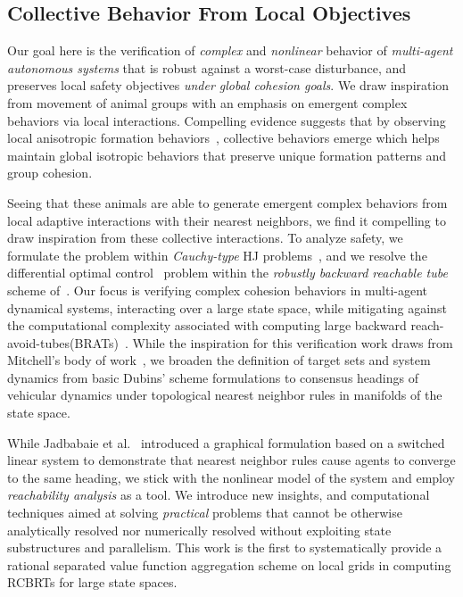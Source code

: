 \subsection{Collective Behavior From Local Objectives}
%
Our goal here is the verification of  \textit{complex} and \textit{nonlinear} behavior of  \textit{multi-agent autonomous systems} that is robust against a worst-case disturbance, and preserves local safety objectives \textit{under global cohesion goals}. We draw inspiration from  movement of animal groups with an emphasis on emergent complex behaviors via local interactions. Compelling evidence suggests that by observing local anisotropic formation behaviors~\cite{Ballerini1232}, collective behaviors emerge which helps maintain global isotropic behaviors that preserve unique formation patterns and group cohesion. 

Seeing that these animals are able to generate emergent complex behaviors from local adaptive interactions with their nearest neighbors, we find it compelling to draw inspiration from these collective interactions. To analyze safety, we formulate the problem within \textit{Cauchy-type} HJ problems~\cite{Crandall1983viscosity}, and we resolve the  differential optimal control~\cite{LygerosReachability} problem within the \textit{robustly backward reachable tube} scheme of~\cite{Mitchell2020}. Our focus is verifying complex cohesion behaviors in multi-agent dynamical systems, interacting over a large state space, while mitigating against the computational complexity associated with computing large backward reach-avoid-tubes(BRATs)~\cite{SylviaScalability, Bajcsy, DecompChenHerbert}. While the inspiration for this verification work draws from Mitchell's body of work~\cite{Mitchell2005}, we broaden the definition of target sets and system dynamics from basic Dubins' scheme formulations to consensus headings of vehicular dynamics under  topological  nearest neighbor rules in manifolds of the state space. 

While Jadbabaie et al.~\cite{JadbabaieCoord} introduced a graphical formulation based on a switched linear system to demonstrate that nearest neighbor rules cause agents to converge to the same heading, we stick with the nonlinear model of the system and employ \textit{reachability analysis} as a tool.  We introduce new insights, and computational techniques aimed at solving \textit{practical} problems that cannot be otherwise analytically resolved nor numerically resolved without exploiting state substructures and parallelism. This work is the first to systematically provide a rational separated value function aggregation  scheme on local grids in computing RCBRTs for large state spaces.

